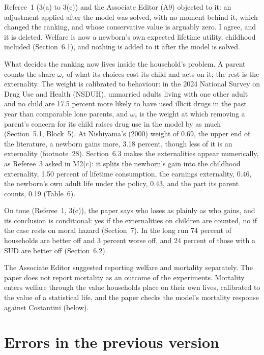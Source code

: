 \documentclass[11pt]{article}
\begin{document}
{\color{respred}
Referee~1 (3(a) to 3(c)) and the Associate Editor (A9) objected to it: an adjustment applied
after the model was solved, with no moment behind it, which changed the ranking, and whose
conservative value is arguably zero. I agree, and it is deleted. Welfare is now a newborn's
own expected lifetime utility, childhood included (Section~6.1), and nothing is added to it
after the model is solved.

What decides the ranking now lives inside the household's problem. A parent counts the share
$\omega_c$ of what its choices cost its child and acts on it; the rest is the externality. The
weight is calibrated to behaviour: in the 2024 National Survey on Drug Use and Health (NSDUH),
unmarried adults living with one other adult and no child are 17.5 percent more likely to have
used illicit drugs in the past year than comparable lone parents, and $\omega_c$ is the weight
at which removing a parent's concern for its child raises drug use in the model by as much
(Section~5.1, Block~5). At Nishiyama's (2000) weight of 0.69, the upper end of the literature,
a newborn gains more, 3.18 percent, though less of it is an externality (footnote~28).
Section~6.3 makes the externalities appear numerically, as Referee~3 asked in M2(c): it splits
the newborn's gain into the childhood externality, 1.50 percent of lifetime consumption, the
earnings externality, 0.46, the newborn's own adult life under the policy, 0.43, and the part
its parent counts, 0.19 (Table~6).

On tone (Referee~1, 3(c)), the paper says who loses as plainly as who gains, and its
conclusion is conditional: yes if the externalities on children are counted, no if the case
rests on moral hazard (Section~7). In the long run 74 percent of households are better off and
3 percent worse off, and 24 percent of those with a SUD are better off (Section~6.2).

\open The Associate Editor suggested reporting welfare and mortality separately. The paper does
not report mortality as an outcome of the experiments. Mortality enters welfare through the
value households place on their own lives, calibrated to the value of a statistical life, and
the paper checks the model's mortality response against Costantini (below).
}

\section*{\color{respred}Errors in the previous version}
\end{document}
